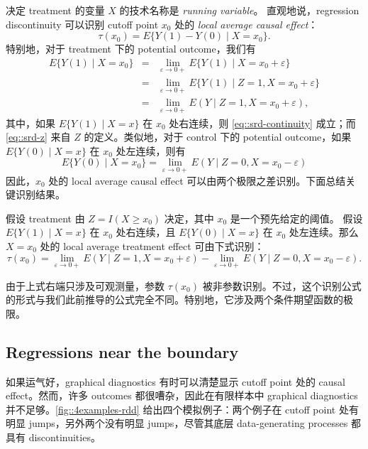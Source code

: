 决定 treatment 的变量 $X$ 的技术名称是 {\it running variable}。
直观地说，regression discontinuity 可以识别 cutoff point $x_0$ 处的 {\it local average causal effect}：
$$
\tau(x_0) = E\{ Y(1) - Y(0)  \mid X=x_0 \}. 
$$
特别地，对于 treatment 下的 potential outcome，我们有
\begin{eqnarray}
E\{ Y(1) \mid X=x_0 \} &=& \lim_{\varepsilon \rightarrow 0+ } E\{ Y(1) \mid X=x_0+\varepsilon \} \label{eq::srd-continuity} \\
&=& \lim_{\varepsilon \rightarrow 0+} E\{ Y(1) \mid Z=1, X=x_0+\varepsilon \}  \label{eq::srd-z} \\
&=&  \lim_{\varepsilon \rightarrow 0+} E( Y \mid Z=1, X=x_0+\varepsilon ),
\end{eqnarray} 
其中，如果 $ E\{ Y(1) \mid X=x\}$ 在 $x_0$ 处右连续，则 \cref{eq::srd-continuity} 成立；而 \cref{eq::srd-z} 来自 $Z$ 的定义。类似地，对于 control 下的 potential outcome，如果 $ E\{ Y(0) \mid X=x\}$ 在 $x_0$ 处左连续，则有
$$
E\{ Y(0) \mid X=x_0 \} =  \lim_{\varepsilon \rightarrow 0+} E( Y \mid Z=0, X=x_0-\varepsilon )
$$
因此，$x_0$ 处的 local average causal effect 可以由两个极限之差识别。下面总结关键识别结果。


\begin{theorem}
\label{thm::identification-rdd}
假设 treatment 由 $Z = I(X \geq x_0)$ 决定，其中 $x_0$ 是一个预先给定的阈值。
假设 $ E\{ Y(1) \mid X=x\}$ 在 $x_0$ 处右连续，且 $ E\{ Y(0) \mid X=x\}$ 在 $x_0$ 处左连续。那么 $X=x_0$ 处的 local average treatment effect 可由下式识别：
$$
\tau(x_0) = \lim_{\varepsilon \rightarrow 0+} E( Y \mid Z=1, X=x_0+\varepsilon ) - \lim_{\varepsilon \rightarrow 0+} E( Y \mid Z=0, X=x_0-\varepsilon ).
$$
\end{theorem}

由于上式右端只涉及可观测量，参数 $\tau(x_0)$ 被非参数识别。不过，这个识别公式的形式与我们此前推导的公式完全不同。特别地，它涉及两个条件期望函数的极限。



\subsection{Regressions near the boundary}\label{sec::rdd-numerical}

如果运气好，graphical diagnostics 有时可以清楚显示 cutoff point 处的 causal effect。然而，许多 outcomes 都很嘈杂，因此在有限样本中 graphical diagnostics 并不足够。\cref{fig::4examples-rdd} 给出四个模拟例子：两个例子在 cutoff point 处有明显 jumps，另外两个没有明显 jumps，尽管其底层 data-generating processes 都具有 discontinuities。

